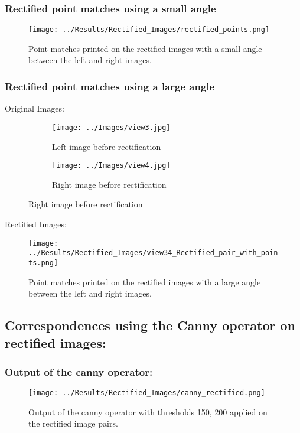 \documentclass{article}
\begin{document}
\subsubsection{Rectified point matches using a small angle}
\begin{figure}[H]
    \centering
    \texttt{[image: ../Results/Rectified\_Images/rectified\_points.png]}
    \caption{Point matches printed on the rectified images with a small angle between the left and right images.}
\end{figure}

\subsubsection{Rectified point matches using a large angle}
Original Images:
\begin{figure}[H]
    \centering
    \begin{subfigure}{0.49\linewidth}
        \centering
        \texttt{[image: ../Images/view3.jpg]}
        \caption{Left image before rectification}
    \end{subfigure}
    \begin{subfigure}{0.49\linewidth}
        \centering
        \texttt{[image: ../Images/view4.jpg]}
        \caption{Right image before rectification}
    \end{subfigure}
\end{figure}

Rectified Images:
\begin{figure}[H]
    \centering
    \texttt{[image: ../Results/Rectified\_Images/view34\_Rectified\_pair\_with\_points.png]}
    \caption{Point matches printed on the rectified images with a large angle between the left and right images.}
\end{figure}

\subsection{Correspondences using the Canny operator on rectified images:}
\subsubsection{Output of the canny operator:}
\begin{figure}[H]
    \centering
    \texttt{[image: ../Results/Rectified\_Images/canny\_rectified.png]}
    \caption{Output of the canny operator with thresholds 150, 200 applied on the rectified image pairs.}
\end{figure}
\end{document}
